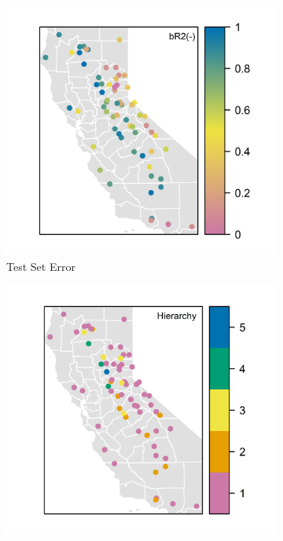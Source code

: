 \begin{figure}
	\centering
	\begin{subfigure}{.5\textwidth}
  		\centering
 		 \includegraphics[width=\textwidth, trim={0 0 0 0}, clip=true]{plots/rplot28_br2map_nn_inc.png}
  		\caption{Test Set Error}
	\end{subfigure}%
	\begin{subfigure}{.5\textwidth}
  		\centering
 		 \includegraphics[width=\textwidth, trim={0 0 0 0}, clip=true]{plots/rplot210_hierarchies.png}

\end{subfigure}
\end{figure}
